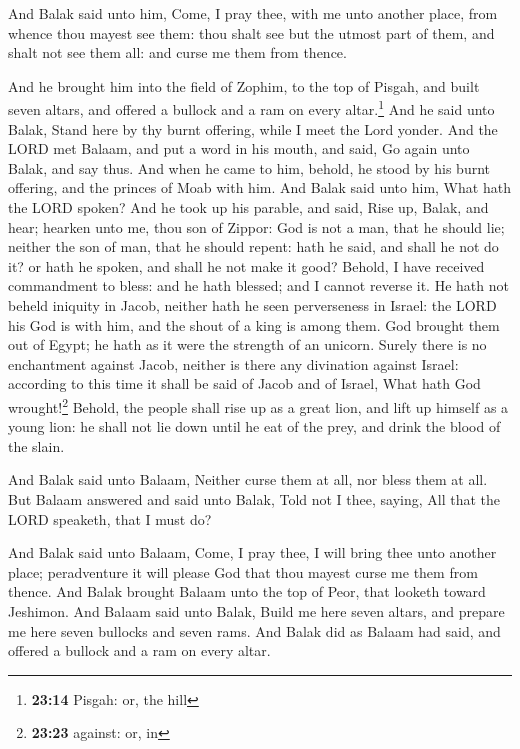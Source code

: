  And Balak said unto him, Come, I pray thee, with me unto
another place, from whence thou mayest see them: thou shalt see but the
utmost part of them, and shalt not see them all: and curse me them from
thence.

 And he brought him into the field of Zophim, to the top
of Pisgah, and built seven altars, and offered a bullock and a ram on
every altar.\footnote{\textbf{23:14} Pisgah: or, the hill}
 And he said unto Balak, Stand here by thy burnt
offering, while I meet the Lord yonder.  And the LORD met
Balaam, and put a word in his mouth, and said, Go again unto Balak, and
say thus.  And when he came to him, behold, he stood by
his burnt offering, and the princes of Moab with him. And Balak said
unto him, What hath the LORD spoken?  And he took up his
parable, and said, Rise up, Balak, and hear; hearken unto me, thou son
of Zippor:  God is not a man, that he should lie; neither
the son of man, that he should repent: hath he said, and shall he not do
it? or hath he spoken, and shall he not make it good? 
Behold, I have received commandment to bless: and he hath blessed; and I
cannot reverse it.  He hath not beheld iniquity in Jacob,
neither hath he seen perverseness in Israel: the LORD his God is with
him, and the shout of a king is among them.  God brought
them out of Egypt; he hath as it were the strength of an unicorn.
 Surely there is no enchantment against Jacob, neither is
there any divination against Israel: according to this time it shall be
said of Jacob and of Israel, What hath God wrought!\footnote{\textbf{23:23}
  against: or, in}  Behold, the people shall rise up as a
great lion, and lift up himself as a young lion: he shall not lie down
until he eat of the prey, and drink the blood of the slain.

 And Balak said unto Balaam, Neither curse them at all,
nor bless them at all.  But Balaam answered and said unto
Balak, Told not I thee, saying, All that the LORD speaketh, that I must
do?

 And Balak said unto Balaam, Come, I pray thee, I will
bring thee unto another place; peradventure it will please God that thou
mayest curse me them from thence.  And Balak brought
Balaam unto the top of Peor, that looketh toward Jeshimon.
 And Balaam said unto Balak, Build me here seven altars,
and prepare me here seven bullocks and seven rams.  And
Balak did as Balaam had said, and offered a bullock and a ram on every
altar.

